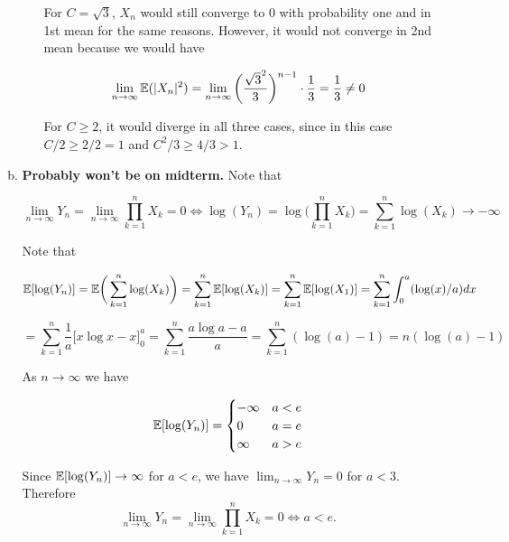 \begin{enumerate}[(1)]
\begin{enumerate}[(a)]
\begin{enumerate}[(i)]
For \(C = \sqrt{3}\), \(X_n\) would still converge to 0 with probability one and in 1st mean for the same reasons. However, it would not converge in 2nd mean because we would have

\[
\lim_{n \to \infty} \mathbb{E}(|X_n|^2) = \lim_{n \to \infty} \bigg( \frac{\sqrt{3}^2}{3}\bigg)^{n-1} \cdot \frac{1}{3} = \frac{1}{3} \neq 0
\]

For \(C \geq 2\), it would diverge in all three cases, since in this case \(C/2 \geq 2/2 = 1\) and \(C^2/3 \geq 4/3 > 1\).

\end{enumerate}

\item \textbf{Probably won't be on midterm.} Note that 

\[
\lim_{n \to \infty} Y_n = \lim_{n \to \infty} \prod_{k=1}^n X_k = 0 \iff \log(Y_n) = \log \bigg( \prod_{k=1}^n X_k\bigg) = \sum_{k=1}^n \log (X_k) \to -\infty
\]

Note that

\[
\mathbb{E}[ \log(Y_n)] = \mathbb{E} \bigg(  \sum_{k=1}^n \log (X_k) \bigg) = \sum_{k=1}^n \mathbb{E}[\log(X_k)] = \sum_{k=1}^n \mathbb{E}[\log(X_1)] = \sum_{k=1}^n \int_0^a ( \log(x) /a) dx
\]

\[
=  \sum_{k=1}^n \frac{1}{a} \big[x \log x - x \big]_0^a =  \sum_{k=1}^n \frac{a \log a - a}{a} =  \sum_{k=1}^n ( \log(a) - 1) =n(\log(a) - 1)
\]

As \(n \to \infty\) we have

\[
\mathbb{E}[ \log(Y_n)]  = \begin{cases}
-\infty & a < e \\ 
0 & a = e \\ 
\infty & a > e 
\end{cases}
\]

Since \(\mathbb{E}[ \log(Y_n)] \to \infty\) for \(a < e\), we have \(\lim_{n \to \infty} Y_n = 0\) for \(a < 3\). Therefore \[\boxed{\lim_{n \to \infty}Y_n = \lim_{n \to \infty} \prod_{k=1}^n X_k = 0 \iff a < e.}\]


\end{enumerate}

\end{enumerate}



%
%
%
%
%
%
%
%

%

